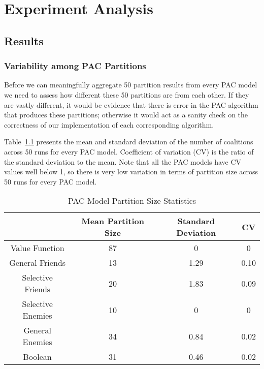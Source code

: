 
\chapter{Experiment Analysis}
\label{ch:analysis}
\vspace{2em}

\section{Results}

\subsection{Variability among PAC Partitions}
\label{subsec:variability_among_pac_partitions}

Before we can meaningfully aggregate 50 partition results from every PAC model
we need to assess how different these 50 partitions are from each other.
If they are vastly different, it would be evidence that there is error in the
PAC algorithm that produces these partitions; otherwise it would act as a sanity
check on the correctness of our implementation of each corresponding algorithm.

Table~\ref{analysis:table:pac_num_coalitions} presents the mean and standard
deviation of the number of coalitions across 50 runs for every PAC model.
Coefficient of variation (CV) is the ratio of the standard deviation to the mean.
Note that all the PAC models have CV values well below 1, so there is very low
variation in terms of partition size across 50 runs for every PAC model.

\begin{table}[h!]
\centering
\begin{tabular}{|c|c|c|c|}
\hline
       & Mean Partition Size & Standard Deviation & CV \\ \hline
Value Function & 87 & 0 & 0 \\
General Friends & 13 & 1.29 & 0.10  \\
Selective Friends & 20 & 1.83 & 0.09  \\
Selective Enemies & 10 & 0 & 0 \\
General Enemies & 34 & 0.84 & 0.02 \\
Boolean & 31 & 0.46 & 0.02  \\
\hline
\end{tabular}
\caption{PAC Model Partition Size Statistics}
\label{analysis:table:pac_num_coalitions}
\end{table}

